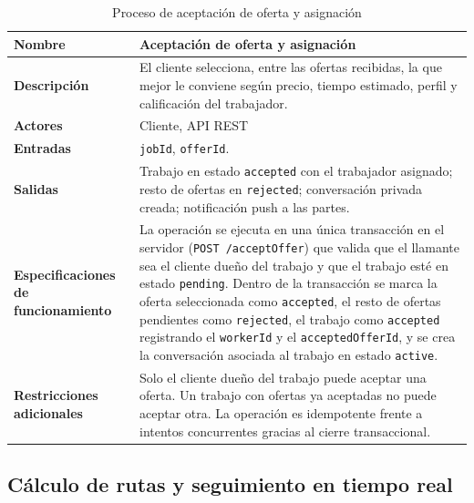 \documentclass[doc,12pt,a4paper]{apa7}
\begin{document}
\begin{longtable}{|P{3.3cm}|L{11.2cm}|}
\caption{Proceso de aceptación de oferta y asignación}\\
\hline
\textbf{Nombre} & Aceptación de oferta y asignación \\ \hline
\textbf{Descripción} & El cliente selecciona, entre las ofertas recibidas, la que mejor le conviene según precio, tiempo estimado, perfil y calificación del trabajador. \\ \hline
\textbf{Actores} & Cliente, API REST \\ \hline
\textbf{Entradas} & \texttt{jobId}, \texttt{offerId}. \\ \hline
\textbf{Salidas} & Trabajo en estado \texttt{accepted} con el trabajador asignado; resto de ofertas en \texttt{rejected}; conversación privada creada; notificación push a las partes. \\ \hline
\textbf{Especificaciones de funcionamiento} & La operación se ejecuta en una única transacción en el servidor (\texttt{POST /acceptOffer}) que valida que el llamante sea el cliente dueño del trabajo y que el trabajo esté en estado \texttt{pending}. Dentro de la transacción se marca la oferta seleccionada como \texttt{accepted}, el resto de ofertas pendientes como \texttt{rejected}, el trabajo como \texttt{accepted} registrando el \texttt{workerId} y el \texttt{acceptedOfferId}, y se crea la conversación asociada al trabajo en estado \texttt{active}. \\ \hline
\textbf{Restricciones adicionales} & Solo el cliente dueño del trabajo puede aceptar una oferta. Un trabajo con ofertas ya aceptadas no puede aceptar otra. La operación es idempotente frente a intentos concurrentes gracias al cierre transaccional. \\ \hline
\end{longtable}

\subsection{Cálculo de rutas y seguimiento en tiempo real}
\end{document}
